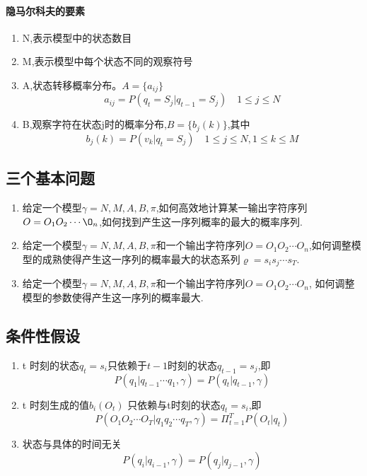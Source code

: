 \documentclass[a4paper]{ctexart}
\begin{document}
\paragraph{隐马尔科夫的要素}
\begin{enumerate}
\item N,表示模型中的状态数目
\item M,表示模型中每个状态不同的观察符号
\item A,状态转移概率分布。$A=\{a_{ij}\}$
    \begin{equation}
    a_{ij} = P(q_t = S_j | q_{t-1} = S_j) \quad 1\le j\le N     
    \end{equation}
\item B,观察字符在状态j时的概率分布,$B=\{b_j(k)\}$,其中
    \begin{equation}
    b_j(k) = P(v_k|q_t = S_j) \quad 1\le j \le N, 1 \le k \le M
    \end{equation}
\end{enumerate}

\subsection{三个基本问题}
\begin{enumerate}
    \item 给定一个模型$\gamma = {N,M,A,B,\pi}$,如何高效地计算某一输出字符序列$O= O_1 O_2 \cdots \O_n$,如何找到产生这一序列概率的最大的概率序列.
    \item 给定一个模型$\gamma = {N,M,A,B,\pi}$和一个输出字符序列$O=O_1O_2\cdots O_n$,如何调整模型的成熟使得产生这一序列的概率最大的状态系列$\varrho = s_is_j\cdots s_T$.
    \item 给定一个模型$\gamma = {N,M,A,B,\pi}$和一个输出字符序列$O=O_1O_2\cdots O_n$, 如何调整模型的参数使得产生这一序列的概率最大.
\end{enumerate}
\subsection{条件性假设}
\begin{enumerate}
    \item t 时刻的状态$q_t = s_i$只依赖于$t-1$时刻的状态$q_{t-1} = s_j$,即
        \begin{equation}
            P(q_1|q_{t-1}\cdots q_1, \gamma) = P(q_t|q_{t-1},\gamma)
        \end{equation}
    \item t 时刻生成的值$b_i(O_t)$ 只依赖与t时刻的状态$q_t=s_i$,即
        \begin{equation}
            P(O_1O_2\cdots O_T | q_1 q_2 \cdots q_T, \gamma) = \Pi_{t=1}^{T}P(O_{t}|q_{t})
        \end{equation}
    \item 状态与具体的时间无关
        \begin{equation}
            P(q_i | q_{i-1}, \gamma) = P(q_j | q_{j-1}, \gamma)
        \end{equation}
\end{enumerate}
\end{document}

